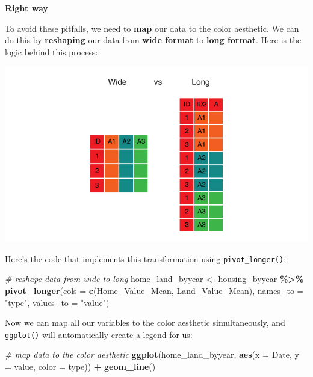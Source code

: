 \documentclass[
]{book}
\newenvironment{Shaded}{\begin{snugshade}}{\end{snugshade}}
\newcommand{\CommentTok}[1]{\textcolor[rgb]{0.56,0.35,0.01}{\textit{#1}}}
\newcommand{\DataTypeTok}[1]{\textcolor[rgb]{0.13,0.29,0.53}{#1}}
\newcommand{\KeywordTok}[1]{\textcolor[rgb]{0.13,0.29,0.53}{\textbf{#1}}}
\newcommand{\NormalTok}[1]{#1}
\newcommand{\OperatorTok}[1]{\textcolor[rgb]{0.81,0.36,0.00}{\textbf{#1}}}
\newcommand{\StringTok}[1]{\textcolor[rgb]{0.31,0.60,0.02}{#1}}
\begin{document}
\textbf{Right way}

To avoid these pitfalls, we need to \textbf{map} our data to the color aesthetic. We can do this by \textbf{reshaping} our data from \textbf{wide format} to \textbf{long format}. Here is the logic behind this process:

\includegraphics{R/Rgraphics/images/wide_vs_long.png}

Here's the code that implements this transformation using \texttt{pivot\_longer()}:

\begin{Shaded}
\begin{Highlighting}[]
\CommentTok{\# reshape data from wide to long}
\NormalTok{home\_land\_byyear \textless{}{-}}\StringTok{ }
\StringTok{    }\NormalTok{housing\_byyear }\OperatorTok{\%\textgreater{}\%}
\StringTok{    }\KeywordTok{pivot\_longer}\NormalTok{(}\DataTypeTok{cols =} \KeywordTok{c}\NormalTok{(Home\_Value\_Mean, Land\_Value\_Mean),}
                 \DataTypeTok{names\_to =} \StringTok{"type"}\NormalTok{,}
                 \DataTypeTok{values\_to =} \StringTok{"value"}\NormalTok{)}
\end{Highlighting}
\end{Shaded}

Now we can map all our variables to the color aesthetic simultaneously, and \texttt{ggplot()} will automatically create a legend for us:

\begin{Shaded}
\begin{Highlighting}[]
\CommentTok{\# map data to the color aesthetic                  }
\KeywordTok{ggplot}\NormalTok{(home\_land\_byyear, }\KeywordTok{aes}\NormalTok{(}\DataTypeTok{x =}\NormalTok{ Date, }\DataTypeTok{y =}\NormalTok{ value, }\DataTypeTok{color =}\NormalTok{ type)) }\OperatorTok{+}
\StringTok{  }\KeywordTok{geom\_line}\NormalTok{()}
\end{Highlighting}
\end{Shaded}
\end{document}
